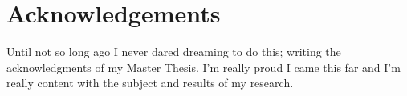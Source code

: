\documentclass[a4paper, 11pt]{book}
\begin{document}
\setcounter{page}{1}

\tableofcontents{}
\listoffigures{}
\listoftables{}

\chapter*{Acknowledgements}
Until not so long ago I never dared dreaming to do this; writing the acknowledgments of my Master Thesis. I'm really proud I came this far and I'm really content with the subject and results of my research.

\cleardoublepage
{}
\setcounter{page}{1}














\cleardoublepage
{}
{}





\end{document}
